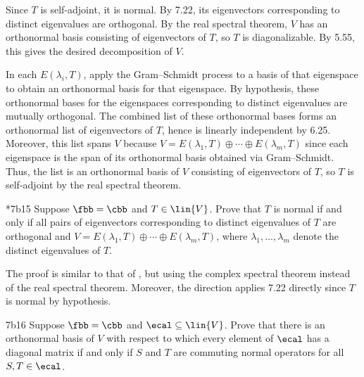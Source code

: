 \begin{soliff}
    \rightimp Since $T$ is self-adjoint, it is normal.
    By 7.22, its eigenvectors corresponding to distinct eigenvalues are orthogonal.
    By the real spectral theorem, $V$ has an orthonormal basis consisting of eigenvectors of $T$, so $T$ is diagonalizable.
    By 5.55, this gives the desired decomposition of $V$.

    \leftimp In each $E(\lambda_i, T)$, apply the Gram--Schmidt process to a basis of that eigenspace to obtain an orthonormal basis for that eigenspace.
    By hypothesis, these orthonormal bases for the eigenspaces corresponding to distinct eigenvalues are mutually orthogonal.
    The combined list of these orthonormal bases forms an orthonormal list of eigenvectors of $T$, hence is linearly independent by 6.25.
    Moreover, this list spans $V$ because $V = E(\lambda_1, T) \oplus \cdots \oplus E(\lambda_m, T)$ since each eigenspace is the span of its orthonormal basis obtained via Gram--Schmidt.
    Thus, the list is an orthonormal basis of $V$ consisting of eigenvectors of $T$, so $T$ is self-adjoint by the real spectral theorem.
\end{soliff}

\begin{exercise}*{7b15}
    Suppose $\fbb = \cbb$ and $T \in \lin{V}$.
    Prove that $T$ is normal if and only if all pairs of eigenvectors corresponding to distinct eigenvalues of $T$ are orthogonal and $V = E(\lambda_1, T) \oplus \cdots \oplus E(\lambda_m, T)$, where $\lambda_1, \ldots, \lambda_m$ denote the distinct eigenvalues of $T$.

\end{exercise}

\begin{sol}
    The proof is similar to that of , but using the complex spectral theorem instead of the real spectral theorem.
    Moreover, the \rightimp direction applies 7.22 directly since $T$ is normal by hypothesis.
\end{sol}

\begin{exercise}{7b16}
    Suppose $\fbb = \cbb$ and $\ecal \subseteq \lin{V}$.
    Prove that there is an orthonormal basis of $V$ with respect to which every element of $\ecal$ has a diagonal matrix if and only if $S$ and $T$ are commuting normal operators for all $S, T \in \ecal$.

\end{exercise}

